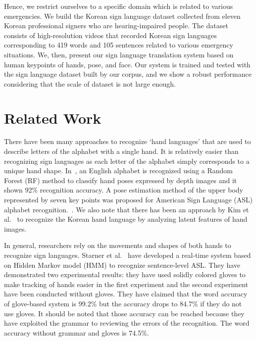 \documentclass[10pt,twocolumn,letterpaper]{article}
\begin{document}
Hence, we restrict ourselves to a specific domain which is related to various emergencies. We build the Korean sign language dataset collected from eleven Korean professional signers who are hearing-impaired people. The dataset consists of high-resolution videos that recorded Korean sign languages corresponding to 419 words and 105 sentences related to various emergency situations.
We, then, present our sign language translation system based on human keypoints of hands, pose, and face. Our system is trained and tested with the sign language dataset built by our corpus, and we show a robust performance considering that the scale of dataset is not large enough.

\section{Related Work}
There have been many approaches to recognize `hand languages' that are used to describe letters of the alphabet with a single hand. It is relatively easier than recognizing sign languages as each letter of the alphabet simply corresponds to a unique hand shape. %
In~\cite{DongLY15}, an English alphabet is recognized using a Random Forest (RF) method to classify hand poses expressed by depth images and it shown 92\% recognition accuracy. A pose estimation method of the upper body represented by seven key points was proposed for American Sign Language (ASL) alphabet recognition.~\cite{gattupalli2016evaluation}. We also note that there has been an approach by Kim et al.~\cite{KimK16} to recognize the Korean hand language by analyzing latent features of hand images.

In general, researchers rely on the movements and shapes of both hands to recognize sign languages. Starner et al.~\cite{StarnerP95} have developed a real-time system based on Hidden Markov model (HMM) to recognize sentence-level ASL. They have demonstrated two experimental results: they have used solidly colored gloves to make tracking of hands easier in the first experiment and the second experiment have been conducted without gloves. They have claimed that the word accuracy of glove-based system is 99.2\% but the accuracy drops to 84.7\% if they do not use gloves. It should be noted that those accuracy can be reached because they have exploited the grammar to reviewing the errors of the recognition. The word accuracy without grammar and gloves is 74.5\%. 
\end{document}

